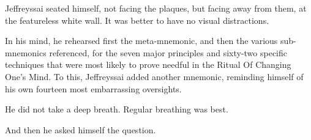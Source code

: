 {
 Jeffreyssai seated himself, not facing the plaques, but facing
away from them, at the featureless white wall. It was better to have no
visual distractions.}

{
 In his mind, he rehearsed first the meta-mnemonic, and then the
various sub-mnemonics referenced, for the seven major principles and
sixty-two specific techniques that were most likely to prove needful in
the Ritual Of Changing One's Mind. To this, Jeffreyssai
added another mnemonic, reminding himself of his own fourteen most
embarrassing oversights.}

{
 He did not take a deep breath. Regular breathing was best.}

{
 And then he asked himself the question.}

\myendsectiontext



